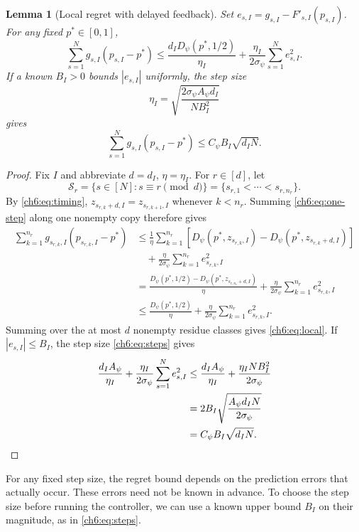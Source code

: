 \documentclass[11pt]{article}
\theoremstyle{plain}
\newtheorem{Thm:Lemma}[Thm:Theorem]{Lemma}
\theoremstyle{remark}
\numberwithin{equation}{section}
\begin{document}
\begin{Thm:Lemma}[Local regret with delayed feedback]\label{ch6:lem:local}
Set $e_{s,I}=g_{s,I}-F'_{s,I}(p_{s,I})$. For any fixed $p^*\in[0,1]$,
\begin{equation}\label{ch6:eq:local}
 \sum_{s=1}^Ng_{s,I}(p_{s,I}-p^*)
 \le\frac{d_I{D_\psi}(p^*,1/2)}{\eta_I}
 +\frac{\eta_I}{2\sigma_\psi}\sum_{s=1}^Ne_{s,I}^2.
\end{equation}
If a known $B_I>0$ bounds $|e_{s,I}|$ uniformly, the step size
\begin{equation}\label{ch6:eq:steps}
 \eta_I=\sqrt{\frac{2\sigma_\psi{A_\psi} d_I}{NB_I^2}}
\end{equation}
gives
\begin{equation}\label{ch6:eq:local-opt}
 \sum_{s=1}^Ng_{s,I}(p_{s,I}-p^*)
 \le{C_\psi} B_I\sqrt{d_IN}.
\end{equation}
\end{Thm:Lemma}
\begin{proof}
Fix $I$ and abbreviate $d=d_I$, $\eta=\eta_I$.  For
$r\in[d]$, let
\[
\mathcal S_r=\{s\in[N]:s\equiv r\pmod d\}
=\{s_{r,1}<\cdots<s_{r,n_r}\}.
\]
By \eqref{ch6:eq:timing},
$z_{s_{r,k}+d,I}=z_{s_{r,k+1},I}$ whenever $k<n_r$.
Summing \eqref{ch6:eq:one-step} along one nonempty copy therefore gives
\begin{align*}
\sum_{k=1}^{n_r}g_{s_{r,k},I}(p_{s_{r,k},I}-p^*)
&\le\frac{1}{\eta}
 \sum_{k=1}^{n_r}\left[
 D_\psi(p^*,z_{s_{r,k},I})
 -D_\psi(p^*,z_{s_{r,k}+d,I})\right]\\
&\quad+\frac{\eta}{2\sigma_\psi}
 \sum_{k=1}^{n_r}e_{s_{r,k},I}^2\\
&=\frac{D_\psi(p^*,1/2)
 -D_\psi(p^*,z_{s_{r,n_r}+d,I})}{\eta}
 +\frac{\eta}{2\sigma_\psi}
 \sum_{k=1}^{n_r}e_{s_{r,k},I}^2\\
&\le\frac{D_\psi(p^*,1/2)}{\eta}
 +\frac{\eta}{2\sigma_\psi}
 \sum_{k=1}^{n_r}e_{s_{r,k},I}^2.
\end{align*}
Summing over the at most $d$ nonempty residue classes gives
\eqref{ch6:eq:local}.
If $|e_{s,I}|\le B_I$, the step size \eqref{ch6:eq:steps} gives
\begin{align*}
\frac{d_IA_\psi}{\eta_I}
+\frac{\eta_I}{2\sigma_\psi}\sum_{s=1}^{N}e_{s,I}^2
&\le\frac{d_IA_\psi}{\eta_I}
+\frac{\eta_INB_I^2}{2\sigma_\psi}\\
&=2B_I\sqrt{\frac{A_\psi d_IN}{2\sigma_\psi}}\\
&=C_\psi B_I\sqrt{d_IN}.\qedhere
\end{align*}
\end{proof}
For any fixed step size, the regret bound depends on the prediction errors
that actually occur. These errors need not be known in advance. To choose
the step size before running the controller, we can use a known upper
bound $B_I$ on their magnitude, as in \eqref{ch6:eq:steps}.
\end{document}
